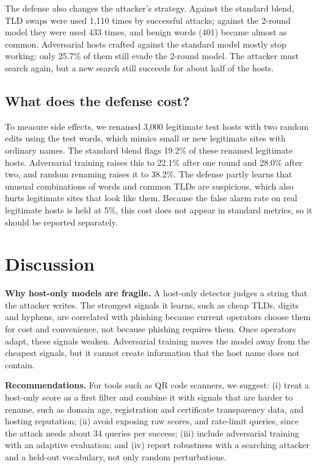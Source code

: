 \documentclass[conference]{IEEEtran}
\begin{document}
The defense also changes the attacker's strategy. Against the standard blend, TLD swaps were used 1,110 times by successful attacks; against the 2-round model they were used 433 times, and benign words (401) became almost as common. Adversarial hosts crafted against the standard model mostly stop working: only 25.7\% of them still evade the 2-round model. The attacker must search again, but a new search still succeeds for about half of the hosts.

\subsection{What does the defense cost?}

To measure side effects, we renamed 3,000 legitimate test hosts with two random edits using the test words, which mimics small or new legitimate sites with ordinary names. The standard blend flags 19.2\% of these renamed legitimate hosts. Adversarial training raises this to 22.1\% after one round and 28.0\% after two, and random renaming raises it to 38.2\%. The defense partly learns that unusual combinations of words and common TLDs are suspicious, which also hurts legitimate sites that look like them. Because the false alarm rate on real legitimate hosts is held at 5\%, this cost does not appear in standard metrics, so it should be reported separately.

\section{Discussion}

\textbf{Why host-only models are fragile.} A host-only detector judges a string that the attacker writes. The strongest signals it learns, such as cheap TLDs, digits and hyphens, are correlated with phishing because current operators choose them for cost and convenience, not because phishing requires them. Once operators adapt, these signals weaken. Adversarial training moves the model away from the cheapest signals, but it cannot create information that the host name does not contain.

\textbf{Recommendations.} For tools such as QR code scanners, we suggest: (i) treat a host-only score as a first filter and combine it with signals that are harder to rename, such as domain age, registration and certificate transparency data, and hosting reputation; (ii) avoid exposing raw scores, and rate-limit queries, since the attack needs about 34 queries per success; (iii) include adversarial training with an adaptive evaluation; and (iv) report robustness with a searching attacker and a held-out vocabulary, not only random perturbations.
\end{document}
